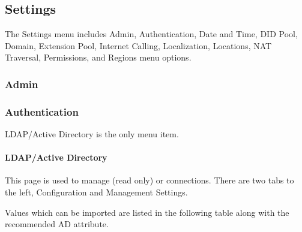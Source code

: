 \documentclass[letterpaper,10pt,english]{sphinxmanual}
\begin{document}
\subsection{Settings}
\label{\detokenize{webui:settings-menu}}\label{\detokenize{webui:id47}}
The Settings menu includes Admin, Authentication, Date and Time, DID Pool, Domain, Extension Pool, Internet Calling, Localization, Locations, NAT Traversal, Permissions, and Regions menu options.


\subsubsection{Admin}
\label{\detokenize{webui:admin}}\label{\detokenize{webui:webui-settings}}\begin{quote}

\end{quote}


\subsubsection{Authentication}
\label{\detokenize{webui:authentication}}\label{\detokenize{webui:id48}}
LDAP/Active Directory is the only menu item.


\paragraph{LDAP/Active Directory}
\label{\detokenize{webui:ldap-active-directory}}\label{\detokenize{webui:ldap-ad}}
This page is used to manage (read only)  or  connections. There are two tabs to the left, Configuration and Management Settings.

Values which can be imported are listed in the following table along with the recommended AD attribute.
\end{document}
